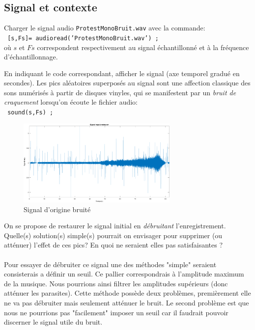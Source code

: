 \documentclass{article}
\begin{document}
\subsection{Signal et contexte}
Charger le signal audio {\tt ProtestMonoBruit.wav} avec la commande:\\[1mm]
{\tt
[s,Fs]= audioread('ProtestMonoBruit.wav') ;\\[1mm]
}
où $s$ et $Fs$ correspondent respectivement au signal échantillonné et à la fréquence d'échantillonnage.

En indiquant le code correspondant, afficher le signal (axe temporel gradué en secondes). Les pics aléatoires superposés au signal sont une affection classique des sons numérisés à partir de disques vinyles, qui se manifestent par un  \textit{bruit de craquement} lorsqu'on écoute le fichier audio:\\[1mm]
{\tt
sound(s,Fs) ;\\[2mm]
}
\begin{figure}[!h] 	
    \centering
    \includegraphics[width=0.7\textwidth]{images/signalorigine.png}
    \caption{Signal d'origine bruité}
    \label{fig-binaire}
\end{figure}

On se propose de restaurer le signal initial en {\em débruitant} l'enregistrement.\\
Quelle(s) solution(s) simple(s) pourrait on envisager pour supprimer (ou atténuer) l'effet de ces pics? En quoi ne seraient elles pas satisfaisantes ?\\ 
\\
Pour essayer de débruiter ce signal une des méthodes "simple" seraient  consisterais a définir un seuil. Ce pallier correspondrais à  l'amplitude maximum de la musique. Nous pourrions ainsi filtrer les amplitudes supérieurs (donc atténuer les parasites). Cette méthode possède deux problèmes, premièrement elle ne va pas débruiter mais seulement atténuer le bruit. Le second problème est que nous ne pourrions pas "facilement" imposer un seuil car il faudrait pouvoir discerner le signal utile du bruit. \newline
\end{document}
